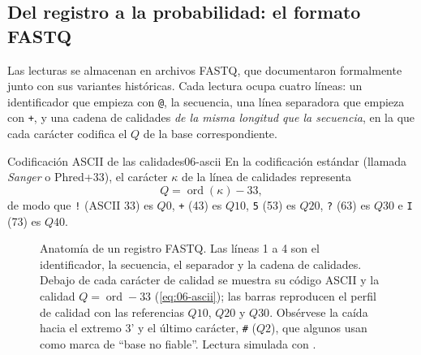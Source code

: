 \subsection{Del registro a la probabilidad: el formato FASTQ}

Las lecturas se almacenan en archivos FASTQ, que \textcite{c06-cock2010} documentaron formalmente junto con sus variantes históricas. Cada lectura ocupa cuatro líneas: un identificador que empieza con \texttt{@}, la secuencia, una línea separadora que empieza con \texttt{+}, y una cadena de calidades \emph{de la misma longitud que la secuencia}, en la que cada carácter codifica el $Q$ de la base correspondiente.

\begin{definicion}{Codificación ASCII de las calidades}{06-ascii}
En la codificación estándar (llamada \emph{Sanger} o Phred+33), el carácter $\kappa$ de la línea de calidades representa
\begin{equation}\label{eq:06-ascii}
Q = \operatorname{ord}(\kappa) - 33,
\end{equation}
de modo que \texttt{!} (ASCII 33) es $Q0$, \texttt{+} (43) es $Q10$, \texttt{5} (53) es $Q20$, \texttt{?} (63) es $Q30$ e \texttt{I} (73) es $Q40$.
\end{definicion}

\begin{simbolos}
\end{simbolos}

\begin{figure}[t]
\centering

\caption[Anatomía de un registro FASTQ]{Anatomía de un registro FASTQ. Las líneas 1 a 4 son el identificador, la secuencia, el separador y la cadena de calidades. Debajo de cada carácter de calidad se muestra su código ASCII y la calidad $Q=\operatorname{ord}-33$ (\cref{eq:06-ascii}); las barras reproducen el perfil de calidad con las referencias $Q10$, $Q20$ y $Q30$. Obsérvese la caída hacia el extremo 3' y el último carácter, \texttt{\#} ($Q2$), que algunos  usan como marca de ``base no fiable''. Lectura simulada con .}
\label{fig:06-fastq}
\end{figure}

